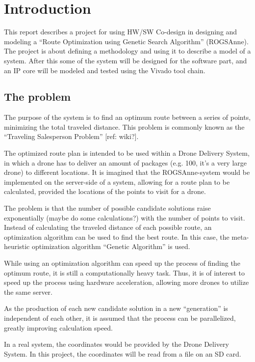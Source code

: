 
\chapter{Introduction}
This report describes a project for using HW/SW Co-design in designing and modeling a “Route Optimization using Genetic Search Algorithm” (ROGSAnne).
The project is about defining a methodology and using it to describe a model of a system. After this some of the system will be designed for the software part, and an IP core will be modeled and tested using the Vivado tool chain.

\section{The problem}
The purpose of the system is to find an optimum route between a series of points, minimizing the total traveled distance. This problem is commonly known as the “Traveling Salesperson Problem” [ref: wiki?].

The optimized route plan is intended to be used within a Drone Delivery System, in which a drone has to deliver an amount of packages (e.g. 100, it’s a very large drone) to different locations. It is imagined that the ROGSAnne-system would be implemented on the server-side of a system, allowing for a route plan to be calculated, provided the locations of the points to visit for a drone.

The problem is that the number of possible candidate solutions raise exponentially (maybe do some calculations?) with the number of points to visit. Instead of calculating the traveled distance of each possible route, an optimization algorithm can be used to find the best route. In this case, the meta-heuristic optimization algorithm “Genetic Algorithm” is used.

While using an optimization algorithm can speed up the process of finding the optimum route, it is still a computationally heavy task. Thus, it is of interest to speed up the process using hardware acceleration, allowing more drones to utilize the same server.

As the production of each new candidate solution in a new “generation” is independent of each other, it is assumed that the process can be parallelized, greatly improving calculation speed.

In a real system, the coordinates would be provided by the Drone Delivery System. In this project, the coordinates will be read from a file on an SD card.